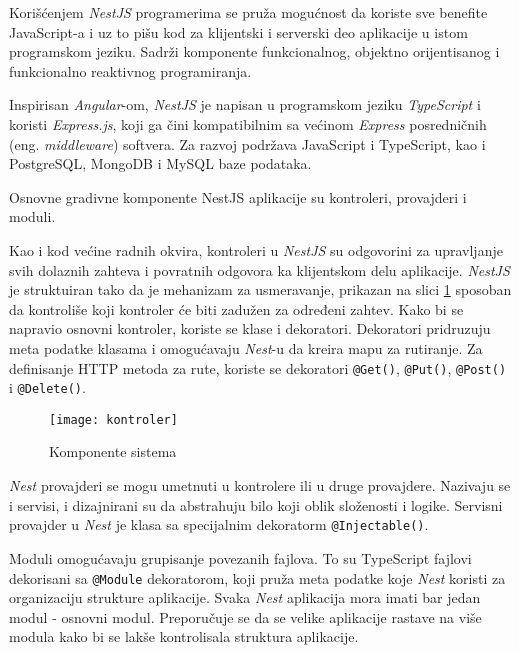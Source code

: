 Korišćenjem \textit{NestJS} programerima se pruža mogućnost da koriste sve benefite JavaScript-a i uz
to pišu kod za klijentski i serverski deo aplikacije u istom programskom jeziku. Sadrži komponente 
funkcionalnog, objektno orijentisanog i funkcionalno reaktivnog programiranja.

Inspirisan \textit{Angular}-om, \textit{NestJS} je napisan u programskom jeziku \textit{TypeScript} 
i koristi \textit{Express.js}, koji ga čini kompatibilnim sa većinom \textit{Express} posredničnih 
(eng. \textit{middleware}) softvera. Za razvoj podržava JavaScript i TypeScript, kao i PostgreSQL, 
MongoDB i MySQL baze podataka.

Osnovne gradivne komponente NestJS aplikacije su kontroleri, provajderi i moduli.

Kao i kod većine radnih okvira, kontroleri u \textit{NestJS} su odgovorini za upravljanje svih dolaznih 
zahteva i povratnih odgovora ka klijentskom delu aplikacije. \textit{NestJS} je struktuiran tako da je 
mehanizam za usmeravanje, prikazan na slici \ref{fig:kontroler} sposoban da kontroliše koji kontroler 
će biti zadužen za određeni zahtev.
Kako bi se napravio osnovni kontroler, koriste se klase i dekoratori. Dekoratori pridruzuju meta 
podatke klasama i omogućavaju \textit{Nest}-u da kreira mapu za rutiranje. Za definisanje HTTP 
metoda za rute, koriste se dekoratori \texttt{@Get()}, \texttt{@Put()}, \texttt{@Post()} i \texttt{@Delete()}.~\cite{nest}

\begin{figure}[h]
    \centering
    \texttt{[image: kontroler]}
    \caption{Komponente sistema}
    \label{fig:kontroler}
\end{figure}
  
\textit{Nest} provajderi se mogu umetnuti u kontrolere ili u druge provajdere. Nazivaju se i servisi, 
i dizajnirani su da abstrahuju bilo koji oblik složenosti i logike.
Servisni provajder u \textit{Nest} je klasa sa specijalnim dekoratorm \texttt{@Injectable()}. 

Moduli omogućavaju grupisanje povezanih fajlova. To su TypeScript fajlovi dekorisani sa 
\texttt{@Module} dekoratorom, koji pruža meta podatke koje \textit{Nest} koristi za organizaciju 
strukture aplikacije. Svaka \textit{Nest} aplikacija mora imati bar jedan modul - osnovni modul. 
Preporučuje se da se velike aplikacije rastave na više modula kako bi se lakše kontrolisala 
struktura aplikacije.

